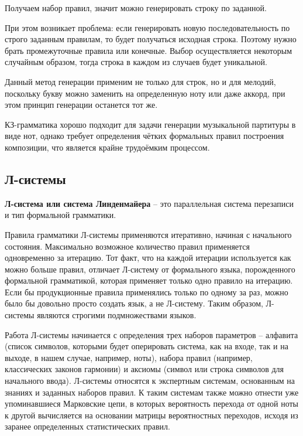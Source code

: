 Получаем набор правил, значит можно генерировать строку по заданной.

При этом возникает проблема: если генерировать новую последовательность по строго заданным правилам, то будет получаться исходная строка. Поэтому нужно брать промежуточные правила или конечные. Выбор осуществляется некоторым случайным образом, тогда строка в каждом из случаев будет уникальной.

Данный метод генерации применим не только для строк, но и для мелодий, поскольку букву можно заменить на определенную ноту или даже аккорд, при этом принцип генерации останется тот же.

КЗ-грамматика хорошо подходит для задачи генерации музыкальной партитуры в виде нот, однако требует определения чётких формальных правил построения композиции, что является крайне трудоёмким процессом.

\subsection{Л-системы}

\textbf{Л-система или система Линденмайера} -- это параллельная система перезаписи и тип формальной грамматики.

Правила грамматики Л-системы применяются итеративно, начиная с начального состояния. Максимально возможное количество правил применяется одновременно за итерацию. Тот факт, что на каждой итерации используется как можно больше правил, отличает Л-систему от формального языка, порожденного формальной грамматикой, которая применяет только одно правило на итерацию. Если бы продукционные правила применялись только по одному за раз, можно было бы довольно просто создать язык, а не Л-систему. Таким образом, Л-системы являются строгими подмножествами языков.

Работа  Л-системы  \cite{l-system}  начинается  с  определения  трех  наборов  параметров -- алфавита (список символов, которыми будет оперировать система, как на входе, так и на выходе, в нашем   случае,   например,   ноты),   набора   правил   (например,   классических   законов гармонии)  и  аксиомы  (символ  или  строка  символов  для  начального  ввода). Л-системы относятся к экспертным системам, основанным на знаниях и заданных наборов правил. К таким  системам  также  можно  отнести уже  упоминавшиеся  Марковские  цепи,  в  которых вероятность  перехода  от  одной  ноты  к  другой  вычисляется  на  основании  матрицы вероятностных переходов, исходя из заранее определенных статистических правил.

